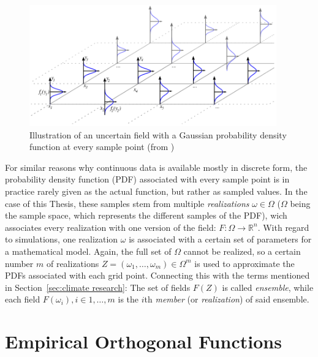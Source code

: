 \begin{figure}[htb]
  \begin{center}
    \includegraphics[width=0.95\textwidth]{figures/uncertain_gaussian_field.png}
  \end{center}
  \caption{Illustration of an uncertain field with a Gaussian probability density function at every sample point (from \cite{pothkow2015modeling})}
  \label{fig:uncertain field example}
\end{figure}

For similar reasons why continuous data is available mostly in discrete form, the probability density function (PDF) associated with every sample point is in practice rarely given as the actual function, but rather as sampled values. 
In the case of this Thesis, these samples stem from multiple \textit{realizations} $\omega \in \Omega$ ($\Omega$ being the sample space, which represents the different samples of the PDF), wich associates every realization with one version of the field: $F: \Omega \rightarrow \mathbb{R}^n$.
With regard to simulations, one realization $\omega$ is associated with a certain set of parameters for a mathematical model. 
Again, the full set of $\Omega$ cannot be realized, so a certain number $m$ of realizations $Z = (\omega_1,\dots,\omega_m) \in \Omega^m$ is used to approximate the PDFs associated with each grid point. 
Connecting this with the terms mentioned in Section~\ref{sec:climate research}: The set of fields $F(Z)$ is called \textit{ensemble}, while each field $F(\omega_i), i \in {1,\dots,m}$ is the $i$th \textit{member} (or \textit{realization}) of said ensemble. \cite{vietinghoffdiss}  


\section{Empirical Orthogonal Functions}
\label{sec:eof}


